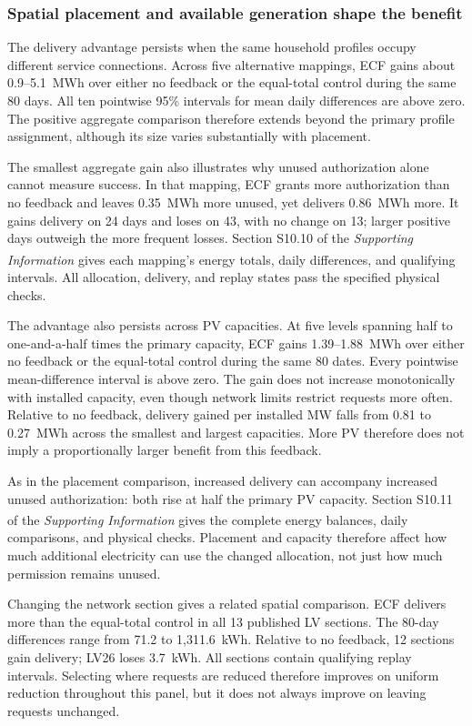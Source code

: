 \documentclass[twoside,twocolumn,9pt]{article}
\newcommand{\suppref}{\textit{Supporting Information}\textsuperscript{\dag}}
\begin{document}
\subsubsection{Spatial placement and available generation shape the benefit}
\label{sec:spatial_results}

The delivery advantage persists when the same household profiles occupy
different service connections. Across five alternative mappings, ECF gains
about 0.9--5.1~MWh over either no feedback or the equal-total control during
the same 80 days. All ten pointwise 95\% intervals for mean daily
differences are above zero. The positive aggregate comparison therefore
extends beyond the primary profile assignment, although its size varies
substantially with placement.

The smallest aggregate gain also illustrates why unused authorization alone
cannot measure success. In that mapping, ECF grants more authorization than
no feedback and leaves 0.35~MWh more unused, yet delivers 0.86~MWh more.
It gains delivery on 24 days and loses on 43, with no change on 13;
larger positive days outweigh the more frequent losses. Section S10.10 of
the \suppref{} gives each mapping's energy totals, daily differences, and
qualifying intervals. All allocation, delivery, and replay states pass the
specified physical checks.

The advantage also persists across PV capacities. At five levels spanning
half to one-and-a-half times the primary capacity, ECF gains 1.39--1.88~MWh
over either no feedback or the equal-total control during the same 80 dates.
Every pointwise mean-difference interval is above zero. The gain does not
increase monotonically with installed capacity, even though network limits
restrict requests more often. Relative to no feedback, delivery gained per
installed MW falls from 0.81 to 0.27~MWh across the smallest and largest
capacities. More PV therefore does not imply a proportionally larger benefit
from this feedback.

As in the placement comparison, increased delivery can accompany increased
unused authorization: both rise at half the primary PV capacity. Section S10.11
of the \suppref{} gives the complete energy balances, daily comparisons, and
physical checks. Placement and capacity therefore affect how much additional
electricity can use the changed allocation, not just how much permission remains unused.

Changing the network section gives a related spatial comparison. ECF delivers
more than the equal-total control in all 13 published LV
sections. The 80-day differences range from 71.2 to 1,311.6~kWh.
Relative to no feedback, 12 sections gain delivery; LV26 loses 3.7~kWh.
All sections contain qualifying replay intervals. Selecting where requests
are reduced therefore improves on uniform reduction throughout this panel,
but it does not always improve on leaving requests unchanged.
\end{document}
